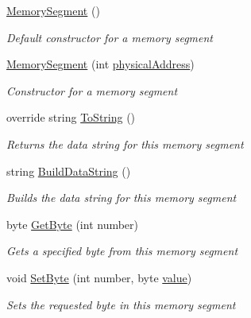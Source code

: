 \begin{DoxyCompactItemize}
\item 
\hyperlink{class_c_p_u___o_s___simulator_1_1_memory_1_1_memory_segment_abd9c898ff9488aaee755f538a3197477}{Memory\+Segment} ()
\begin{DoxyCompactList}\small\item\em Default constructor for a memory segment \end{DoxyCompactList}\item 
\hyperlink{class_c_p_u___o_s___simulator_1_1_memory_1_1_memory_segment_a92848c6604c9d6a9d958783ad7cae24f}{Memory\+Segment} (int \hyperlink{class_c_p_u___o_s___simulator_1_1_memory_1_1_memory_segment_af6d25683cc2a80607238dda52b09d457}{physical\+Address})
\begin{DoxyCompactList}\small\item\em Constructor for a memory segment \end{DoxyCompactList}\item 
override string \hyperlink{class_c_p_u___o_s___simulator_1_1_memory_1_1_memory_segment_a1c94b824fe1fdfc4a0b817a031f3d51d}{To\+String} ()
\begin{DoxyCompactList}\small\item\em Returns the data string for this memory segment \end{DoxyCompactList}\item 
string \hyperlink{class_c_p_u___o_s___simulator_1_1_memory_1_1_memory_segment_a7ad206d46b52b795ba48018afe0174ed}{Build\+Data\+String} ()
\begin{DoxyCompactList}\small\item\em Builds the data string for this memory segment \end{DoxyCompactList}\item 
byte \hyperlink{class_c_p_u___o_s___simulator_1_1_memory_1_1_memory_segment_af3e1120c597c91c8f7aa7faf29d3eda0}{Get\+Byte} (int number)
\begin{DoxyCompactList}\small\item\em Gets a specified byte from this memory segment \end{DoxyCompactList}\item 
void \hyperlink{class_c_p_u___o_s___simulator_1_1_memory_1_1_memory_segment_ab445c7247c0ca2a7b52606b4d14e268a}{Set\+Byte} (int number, byte \hyperlink{_annotations_8cs_aa47dc10177d95db720062975cdba1f3a}{value})
\begin{DoxyCompactList}\small\item\em Sets the requested byte in this memory segment \end{DoxyCompactList}\end{DoxyCompactItemize}
